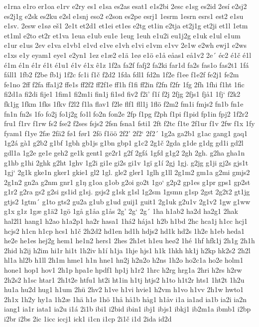 e1rna
e1ro
er1oa
e1rv
e2ry
es1
e1sa
es2as
esat1
e1s2bi
2esc
e1sg
es2id
2esí
e2sj2
es2j1g
e2sk
es2ku
e2sl
e1snj
eso2
e2son
es2pe
esrj1
1esrm
1esrn
esrs1
est2
e1su
e1sv.
2esw
e1sø
eš1
2e1t
et2d1
et1ei
et1es
e2tg
et1in
e2tja
et2j1g
et2ji
et1l
1etm
et1ml
e2to
et2r
et1va
1eua
e1ub
eu1e
1eug
1euh
e1u2i
eu1j2g
e1uk
e1ul
e1um
e1ur
e1us
2ev
e1va
e1vb1
e1vd
e1ve
e1vh
e1vi
e1vm
e1vv
2e1w
e2wh
ewj1
e2ws
e1xs
e1y
eyam1
eye1
e2yn1
1ez
e1æ2
e1ä
1eø
e1ö
e1å
eåas1
eå1v2
2e´
éc2
é1č
é1l
é1m
é1n
é1r
é1t
é1u1
é1v
é1x
ê1z
1f2a
fa2f
fafj2
fa2ki
far1d
fa2s
fas1o
fas2t1
1fá
fáll1
1fb2
f2be
fb1j
1f2c
fc1i
f1č
f2d2
1fda
fdl1
fd2n
1f2e
f1ee
f1e2f
fe2j1
fe2m
fe1no
2ff
f2fa
ffa1j2
ffe1s
ff2f2
ff2f1e
ff1h
f1fi
ff2in
f2fn
f2fr
1fg
2fh
1fhi
f1ht
1fic
fi2d1a
fi2di
fije1
1fim1
fi2m1i
fin1j
fi1sd
fiv2
f2i'
f1í
f2j
2fjg
2fjs1
fjå1
1fj`
f2k2
fk1jg
1fkm
1fks
1fkv
f2l2
f1la
flav1
f2le
flf1
fll1j
1flö
f2m2
fm1i
fmjs2
fn1b
fn1e
fn1n
fn2s
1fo
fo2j
fo1j2g
fo1l
fo2n
fon2e
2fp
f1pg
f2ph
f1pi
f1pid
fp1in
fpj2
1f2r2
fru1
f1rv
f1rw
fs2
fse2
f2ses
fsjs2
2fsn
fsna1
fsti1
2ft
f2tc
f1te
2f1ur
f1v
2fw
f1x
1fy
fyam1
f1ye
2fæ
2fä2
fø1
før1
2fö
f1öö
2f2'
2f2`
2f2´
1g2a
ga2b1
g1ac
gang1
gaq1
1g2á
gà1
g2b2
g1bf
1gbh
gb1js
g1bn
gbp1
g1c2
2g1č
2gda
g1de
g1dg
gd1i
gd2l
gdl1a
1g2e
ge1e
geh2
ge1k
gent1
ge2r1
g2f
2gfá
1gfd
g1g2
2gh
2gh.
g2ha
gha1n
g1hb
g1hi
2ghk
g2ht
1ghv
1g2i
gi1e
gi2s
gi1v
1gï
g1í
2gj
1gj.
g2jg
g1ji
gj2s
gjs1t
1gj`
2g1k
gke1n
gker1
gkie1
gl2
1gl.
gle2
gler1
1glh
g1ll
2g1m2
gm1a
g2mi
gmjs2
2g1n2
gn2a
g2nm
gnr1
g1ŋ
g1oa
g1ob
g2oi
go2t
1go`
g2p2
gp1es
g1pr
gps1
gp2st
g1r2
g2ra
gs2
g2si
gs1id
g1sj.
gsjs2
g1sk
g1sl
1g2sm
1gsmn
g1sp
2gst
2g2t2
gt1jg
gtjs2
1gtm´
g1to
gts2
gu2a
g1ub
g1ud
guij1
guit1
2g1uk
g2u1v
2g1v2
1gw
g1ww
g1x
g1z
1gæ
g1ä2
1gö
1gå
g1åa
g1ås
2g'
2g`
2g´
1ha
h1ab2
ha2d
ha2g1
2hak
hal2l1
hang1
h2ao
h1a2p1
ha2r
hasa1
1há2
hája1
h2b
h1bd
2hc
hca1j
h1cc
hcj1
hcjs2
h1cn
h1cp
hcs1
h1č
2h2d2
hd1en
hd1h
hdjs2
hd1k
hd2s
1h2e
h1eb
heda1
he2e
he1es
hej2g
hem1
he1n2
hers1
2hes
2h1et
h1eu
heø2
1hé
1hf
hfk1j
2h1g
2h1h
2hid
h2ij
h2im
hi1r
hi1t
1h2iv
h1í
h1ja
1hje
hjs1
h1k
1hkh
hk1j
h2kp
hk2s2
2h2l
hl1a
hl2b
h1ll
2h1m
hme1
h1n
hne1
hn2j
h2n2o
h2ns
1h2o
ho2c1a
ho2e
holm1
hone1
hop1
hov1
2h1p
hpa1e
hpdf1
hp1j
h1r2
1hrc
h2rg
hrg1a
2hri
h2rs
h2rw
2h2s2
h1sc
htar1
2h1t2e
htfu1
ht2i
ht1in
h1tj
htjs2
h1to
h1t2r
hts1
1ht2t
1h2u
hu1a
hu2d
hug1
h1um
2hü
2hv2
h1ve
h1vi
hvie1
h2vm
h1vo
h1vv
2h1w
hwto1
2h1x
1h2y
hy1a
1h2æ
1hä
h1ø
1hö
1hå
hå1b
håg1
h1åv
i1a
ia1ad
ia1b
ia2i
ia2n
iang1
ia1r
iata1
ia2u
i1á
2i1b
ibi1
i2bid
ibin1
ibj1
ibjs1
ibkj1
ib2m1a
ibmb1
i2bp
i2br
i2bs
2ic
1icc
iccj1
ick1
i1cn
i1cp
2i1č
i1d
2ida
id2d
